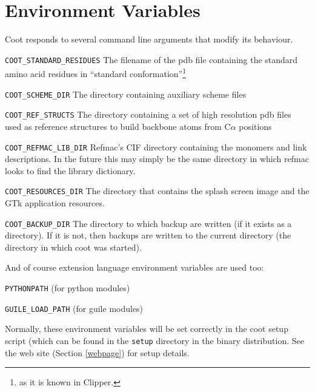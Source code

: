 \documentclass{book}
\begin{document}
\section{Environment Variables}
Coot responds to several command line arguments that modify its
behaviour.  

\begin{trivlist}
\item [\texttt{COOT\_STANDARD\_RESIDUES}] The filename of the pdb file
  containing the standard amino acid residues in ``standard
  conformation''\footnote{as it is known in Clipper.}
\item [\texttt{COOT\_SCHEME\_DIR}] The directory containing auxiliary scheme
  files 
\item [\texttt{COOT\_REF\_STRUCTS}] The directory containing a set of
  high resolution pdb files used as reference structures to build backbone atoms from
  C$\alpha$ positions
\item [\texttt{COOT\_REFMAC\_LIB\_DIR}] Refmac's
  CIF directory containing the monomers and link descriptions.  In the future
  this may simply be the same directory in which refmac looks to find
  the library dictionary.
\item [\texttt{COOT\_RESOURCES\_DIR}] The directory that contains the
  splash screen image and the GTk application resources.
\item [\texttt{COOT\_BACKUP\_DIR}] The directory to which backup are
  written (if it exists as a directory).  If it is not, then backups
  are written to the current directory (the directory in which coot
  was started).
\end{trivlist}
  
And of course extension language environment variables are used too:

\begin{trivlist}
\item [\texttt{PYTHONPATH}] (for python modules)
\item [\texttt{GUILE\_LOAD\_PATH}] (for guile modules)
\end{trivlist}

Normally, these environment variables will be set correctly in the
coot setup script (which can be found in the \texttt{setup} directory
in the binary distribution.  See the web site (Section \ref{webpage})
for setup details.
\end{document}
